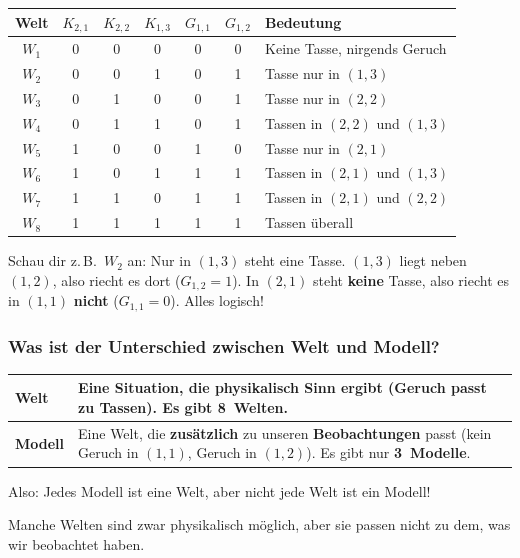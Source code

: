 \documentclass[a4paper,12pt]{article}
\begin{document}
\begin{center}
\renewcommand{\arraystretch}{1.4}
\begin{tabular}{c|ccc|cc|l}
\toprule
Welt & $K_{2,1}$ & $K_{2,2}$ & $K_{1,3}$
     & $G_{1,1}$ & $G_{1,2}$ & Bedeutung \\
\midrule
$W_1$ & 0 & 0 & 0 & 0 & 0 & Keine Tasse, nirgends Geruch \\
$W_2$ & 0 & 0 & 1 & 0 & 1 & Tasse nur in $(1{,}3)$ \\
$W_3$ & 0 & 1 & 0 & 0 & 1 & Tasse nur in $(2{,}2)$ \\
$W_4$ & 0 & 1 & 1 & 0 & 1 & Tassen in $(2{,}2)$ und $(1{,}3)$ \\
$W_5$ & 1 & 0 & 0 & 1 & 0 & Tasse nur in $(2{,}1)$ \\
$W_6$ & 1 & 0 & 1 & 1 & 1 & Tassen in $(2{,}1)$ und $(1{,}3)$ \\
$W_7$ & 1 & 1 & 0 & 1 & 1 & Tassen in $(2{,}1)$ und $(2{,}2)$ \\
$W_8$ & 1 & 1 & 1 & 1 & 1 & Tassen \"uberall \\
\bottomrule
\end{tabular}
\end{center}

Schau dir z.\,B.\ $W_2$ an: Nur in $(1{,}3)$ steht eine Tasse.
$(1{,}3)$ liegt neben $(1{,}2)$, also riecht es dort ($G_{1,2}=1$).
In $(2{,}1)$ steht \textbf{keine} Tasse, also riecht es in $(1{,}1)$
\textbf{nicht} ($G_{1,1}=0$). Alles logisch!

\subsubsection*{Was ist der Unterschied zwischen Welt und Modell?}

\begin{merkbox}[title={Welt vs.\ Modell}]
\renewcommand{\arraystretch}{1.4}
\begin{tabular}{l|p{10cm}}
\textbf{Welt} & Eine Situation, die physikalisch Sinn ergibt
(Geruch passt zu Tassen). Es gibt \textbf{8~Welten}. \\
\hline
\textbf{Modell} & Eine Welt, die \textbf{zus\"atzlich} zu unseren
\textbf{Beobachtungen} passt (kein Geruch in $(1{,}1)$, Geruch
in $(1{,}2)$). Es gibt nur \textbf{3~Modelle}. \\
\end{tabular}

\medskip
Also: Jedes Modell ist eine Welt, aber nicht jede Welt ist ein Modell!

Manche Welten sind zwar physikalisch m\"oglich, aber sie passen nicht
zu dem, was wir beobachtet haben.
\end{merkbox}
\end{document}
